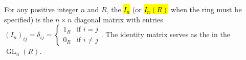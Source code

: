 \begin{definition} \label{definition:identity_matrix}
For any positive integer $n$ and  $R$, the  \hl{$I_n$} (or \hl{$I_n(R)$} when the ring must be specified) is the $n \times n$ diagonal matrix with entries
$(I_n)_{ij} = \delta_{ij} = \begin{cases} 1_R & \text{if } i = j \\ 0_R & \text{if } i \neq j \end{cases}$.
The identity matrix serves as the  in the  $\operatorname{GL}_n(R)$. 
\end{definition}
